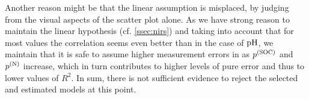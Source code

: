 		Another reason might be that the linear assumption is misplaced, by judging from the visual aspects of the scatter plot alone.
		As we have strong reason to maintain the linear hypothesis (cf. \ref{ssec:nirs}) and taking into account that for most values the correlation seems even better than in the case of $\mathrm{pH}$, we maintain that it is safe to assume higher measurement errors in as $p^{\mathrm{(SOC)}}$ and $p^{\mathrm{(N)}}$ increase, which in turn contributes to higher levels of pure error and thus to lower values of $R^2$.
		In sum, there is not sufficient evidence to reject the selected and estimated models at this point.
		

